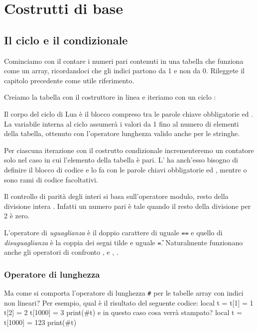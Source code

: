 

\chapter{Costrutti di base}

\section{Il ciclo  e il condizionale }

Cominciamo con il contare i numeri pari contenuti in una tabella che funziona
come un array, ricordandoci che gli indici partono da 1 e non da 0. Rileggete
il capitolo precedente come utile riferimento.

Creiamo la tabella con il costruttore in linea e iteriamo con un ciclo
:

Il corpo del ciclo  di Lua è il blocco compreso tra le parole chiave
obbligatorie  ed . La variabile  interna al ciclo
assumerà i valori da 1 fino al numero di elementi della tabella, ottenuto con
l'operatore lunghezza \key{\#} valido anche per le stringhe.

Per ciascuna iterazione con il costrutto condizionale  incrementeremo un
contatore solo nel caso in cui l'elemento della tabella è pari. L' ha
anch'esso bisogno di definire il blocco di codice e lo fa con le parole chiavi
obbligatorie  ed , mentre  o  sono rami
di codice facoltativi.

Il controllo di parità degli interi si basa sull'operatore modulo, resto della
divisione intera \key{\%}. Infatti un numero pari è tale quando il resto della
divisione per 2 è zero. 

L'operatore di \emph{uguaglianza} è il doppio carattere di uguale \texttt{==} e
quello di \emph{disuguaglianza} è la coppia dei segni tilde e uguale
\texttt{\~=}. Naturalmente funzionano anche gli operatori di confronto \key{>},
\key{>=} e \key{<}, \key{<=}.


\subsection{Operatore di lunghezza}

Ma come si comporta l'operatore di lunghezza \texttt{\#} per le tabelle array
con indici non lineari? Per esempio, qual è il risultato del seguente codice:
\lines
local t = {}
t[1] = 1
t[2] = 2
t[1000] = 3
print(#t)
\endlines
{}
e in questo caso cosa verrà stampato?
\lines
local t = {}
t[1000] = 123
print(#t)
\endlines
{}

